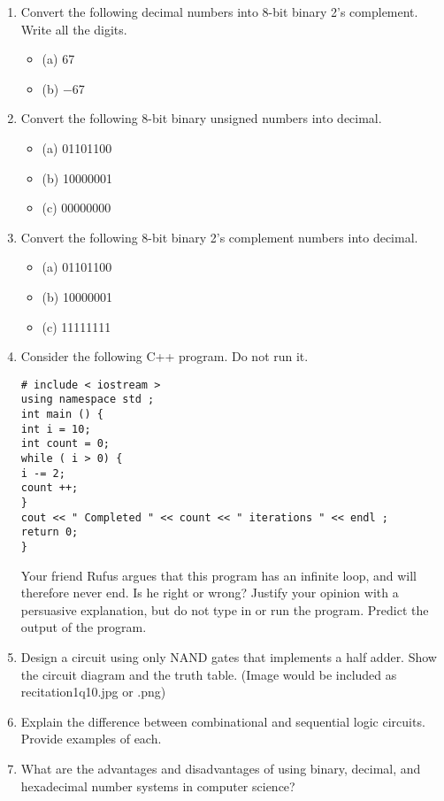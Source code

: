 \documentclass{article}
\begin{document}
\begin{enumerate}
    \item Convert the following decimal numbers into 8-bit binary 2’s complement. Write all the digits.
    \begin{itemize}
        \item (a) 67
        \item (b) −67
    \end{itemize}

    \item Convert the following 8-bit binary unsigned numbers into decimal.
    \begin{itemize}
        \item (a) 01101100
        \item (b) 10000001
        \item (c) 00000000
    \end{itemize}

    \item Convert the following 8-bit binary 2’s complement numbers into decimal.
    \begin{itemize}
        \item (a) 01101100
        \item (b) 10000001
        \item (c) 11111111
    \end{itemize}

    \item Consider the following C++ program. Do not run it.
    \begin{verbatim}
# include < iostream >
using namespace std ;
int main () {
int i = 10;
int count = 0;
while ( i > 0) {
i -= 2;
count ++;
}
cout << " Completed " << count << " iterations " << endl ;
return 0;
}
    \end{verbatim}
    Your friend Rufus argues that this program has an infinite loop, and will therefore never end. Is he right or wrong? Justify your opinion with a persuasive explanation, but do not type in or run the program. Predict the output of the program.

    \item  Design a circuit using only NAND gates that implements a half adder.  Show the circuit diagram and the truth table. (Image would be included as recitation1q10.jpg or .png)

    \item  Explain the difference between combinational and sequential logic circuits. Provide examples of each.

    \item  What are the advantages and disadvantages of using binary, decimal, and hexadecimal number systems in computer science?


\end{enumerate}
\end{document}
